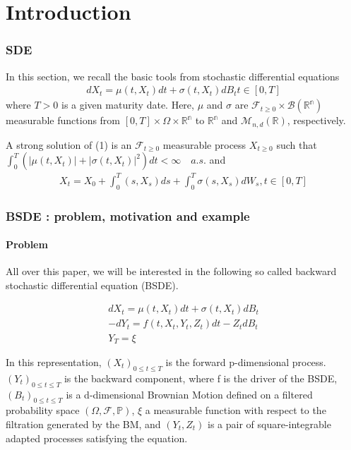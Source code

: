\chapter{Introduction}

\subsection{SDE}

In this section, we recall the basic tools from stochastic differential equations 
\begin{eqnarray}
dX_t = \mu(t,X_t)dt + \sigma (t, X_t) dB_t t\in [0,T]
\end{eqnarray}
where $T >0$ is a given maturity date.  Here,  $\mu$ and $\sigma$ are $\mathcal{F}_{t \geq 0 }\times \mathcal{B}(\mathbb{R^n})$ measurable functions from $[0,T] \times \Omega \times \mathbb{R^n}$ to $\mathbb{R^n}$ and $\mathcal{M}_{n, d}(\mathbb{R})$,  respectively. 

\begin{defn}
A strong  solution  of (1) is  an $\mathcal{F}_{t \geq 0 }$ measurable process $X_{t\geq 0}$ such 
that $\int_{0}^{T}(|\mu(t, X_t)|+|\sigma(t, X_t)|^2)dt < \infty \quad a.s.$  and 
\begin{eqnarray}
X_t = X_0 + \int_{0}^{T}(s, X_s)ds + \int_{0}^{T}\sigma(s, X_s)dW_s, t \in [0,T]
\end{eqnarray}
	
\end{defn}


\subsection{BSDE : problem, motivation and example}

\subsubsection{Problem}

All over this paper, we will be interested in the following so called backward stochastic differential equation (BSDE). 

\begin{eqnarray}
dX_t = \mu(t,X_t)dt + \sigma (t, X_t) dB_t\\
-dY_t = f(t,X_t, Y_t, Z_t)dt - Z_tdB_t \\
Y_T=\xi
\end{eqnarray}

In this representation, $(X_t)_{0 \leq t \leq T}$ is the forward p-dimensional process. 
\newline 
$(Y_t)_{0 \leq t \leq T}$ is the backward component, where f is the driver of the BSDE, $(B_t)_{0 \leq t \leq T}$ is a d-dimensional Brownian Motion defined on a filtered probability space $(\Omega, \mathcal{F}, \mathbb{P})$, $\xi$ a measurable function with respect to the filtration generated by the BM, and $(Y_t, Z_t)$ is a pair of square-integrable adapted processes satisfying the equation. 

